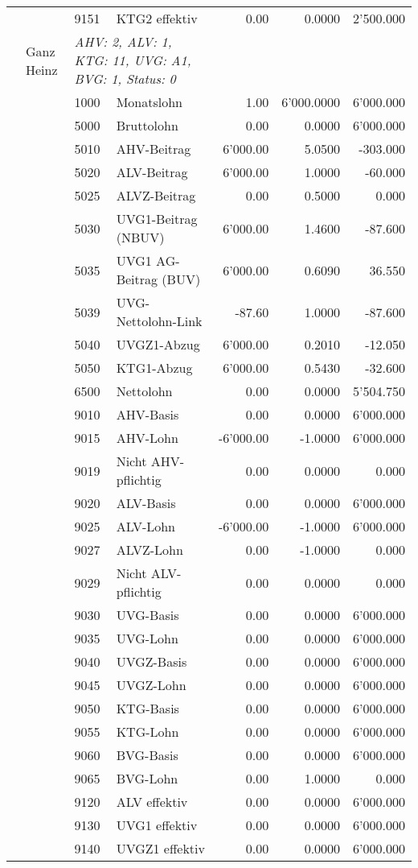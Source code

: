 \documentclass[15pt,a4paper]{article}
\begin{document}
\begin{longtable}{@{\extracolsep{\fill}}l l l l|r|r|r}
&&9151&KTG2 effektiv&0.00&0.0000&2'500.000\\
\pagebreak
10&Ganz Heinz&\multicolumn{2}{l|}{\small\emph{AHV: 2, ALV: 1, KTG: 11, UVG: A1, BVG: 1, Status: 0}}&& \\
&&1000&Monatslohn&1.00&6'000.0000&6'000.000\\
&&5000&Bruttolohn&0.00&0.0000&6'000.000\\
&&5010&AHV-Beitrag&6'000.00&5.0500&-303.000\\
&&5020&ALV-Beitrag&6'000.00&1.0000&-60.000\\
&&5025&ALVZ-Beitrag&0.00&0.5000&0.000\\
&&5030&UVG1-Beitrag (NBUV)&6'000.00&1.4600&-87.600\\
&&5035&UVG1 AG-Beitrag (BUV)&6'000.00&0.6090&36.550\\
&&5039&UVG-Nettolohn-Link&-87.60&1.0000&-87.600\\
&&5040&UVGZ1-Abzug&6'000.00&0.2010&-12.050\\
&&5050&KTG1-Abzug&6'000.00&0.5430&-32.600\\
&&6500&Nettolohn&0.00&0.0000&5'504.750\\
&&9010&AHV-Basis&0.00&0.0000&6'000.000\\
&&9015&AHV-Lohn&-6'000.00&-1.0000&6'000.000\\
&&9019&Nicht AHV-pflichtig&0.00&0.0000&0.000\\
&&9020&ALV-Basis&0.00&0.0000&6'000.000\\
&&9025&ALV-Lohn&-6'000.00&-1.0000&6'000.000\\
&&9027&ALVZ-Lohn&0.00&-1.0000&0.000\\
&&9029&Nicht ALV-pflichtig&0.00&0.0000&0.000\\
&&9030&UVG-Basis&0.00&0.0000&6'000.000\\
&&9035&UVG-Lohn&0.00&0.0000&6'000.000\\
&&9040&UVGZ-Basis&0.00&0.0000&6'000.000\\
&&9045&UVGZ-Lohn&0.00&0.0000&6'000.000\\
&&9050&KTG-Basis&0.00&0.0000&6'000.000\\
&&9055&KTG-Lohn&0.00&0.0000&6'000.000\\
&&9060&BVG-Basis&0.00&0.0000&6'000.000\\
&&9065&BVG-Lohn&0.00&1.0000&0.000\\
&&9120&ALV effektiv&0.00&0.0000&6'000.000\\
&&9130&UVG1 effektiv&0.00&0.0000&6'000.000\\
&&9140&UVGZ1 effektiv&0.00&0.0000&6'000.000\\

\end{longtable}
\end{document}
